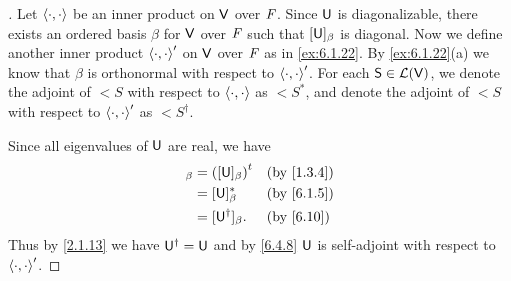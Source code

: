 \begin{proof}[]
  Let \(\left\langle\cdot, \cdot\right\rangle\) be an inner product on \(\mathsf{V}\) over \(\mathit{F}\).
  Since \(\mathsf{U}\) is diagonalizable, there exists an ordered basis \(\beta\) for \(\mathsf{V}\) over \(\mathit{F}\) such that \([\mathsf{U}]_{\beta}\) is diagonal.
  Now we define another inner product \(\left\langle\cdot, \cdot\right\rangle'\) on \(\mathsf{V}\) over \(\mathit{F}\) as in \cref{ex:6.1.22}.
  By \cref{ex:6.1.22}(a) we know that \(\beta\) is orthonormal with respect to \(\left\langle\cdot, \cdot\right\rangle'\).
  For each \(\mathsf{S} \in \mathcal{L}(\mathsf{V})\), we denote the adjoint of \(\lt{S}\) with respect to \(\left\langle\cdot, \cdot\right\rangle\) as \(\lt{S}^*\), and denote the adjoint of \(\lt{S}\) with respect to \(\left\langle\cdot, \cdot\right\rangle'\) as \(\lt{S}^{\dag}\).

  Since all eigenvalues of \(\mathsf{U}\) are real, we have
  \begin{align*}
    [\U]_{\beta} & = \tp{([\U]_{\beta})}  &  & \by{1.3.4} \\
                 & = [\U]_{\beta}^*       &  & \by{6.1.5} \\
                 & = [\U^{\dag}]_{\beta}. &  & \by{6.10}
  \end{align*}
  Thus by \cref{2.1.13} we have \(\mathsf{U}^{\dag} = \mathsf{U}\) and by \cref{6.4.8} \(\mathsf{U}\) is self-adjoint with respect to \(\left\langle\cdot, \cdot\right\rangle'\).


\end{proof}
